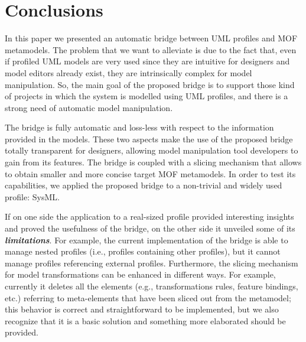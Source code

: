 \section{Conclusions}\label{sec:conclusion}
In this paper we presented an automatic bridge between UML profiles and MOF metamodels.
The problem that we want to alleviate is due to the fact that, even if profiled UML models are very used since they are intuitive for designers and model editors already exist, 
they are intrinsically complex for model manipulation.
So, the main goal of the proposed bridge is to support those kind of projects in which the system is modelled using UML profiles, and there is a strong need of automatic model manipulation.

The bridge is fully automatic and
loss-less with respect to the information provided in the models. 
These two aspects make the use of the proposed bridge totally transparent for designers, allowing
model manipulation tool developers to gain from its features. The bridge is coupled with a slicing mechanism
that allows to obtain smaller and more concise target MOF metamodels.
In order to test its capabilities, we applied the proposed bridge to a non-trivial and widely used profile:
SysML. 

If on one side the application to a real-sized profile provided interesting insights and proved the usefulness of the bridge, on the other side it unveiled some of its \textbf{\textit{limitations}}.
For example, the current implementation of the bridge is able to manage nested profiles (i.e., profiles containing other profiles), but it
cannot manage profiles referencing external profiles.
Furthermore, the slicing mechanism for model transformations can be enhanced in different ways. For example, currently it deletes all the
elements (e.g., transformations rules, feature bindings, etc.) referring to meta-elements that have been sliced out from the metamodel;
this behavior is correct and straightforward to be implemented, but we also recognize that it is a basic solution 
and something more elaborated should be provided. 

